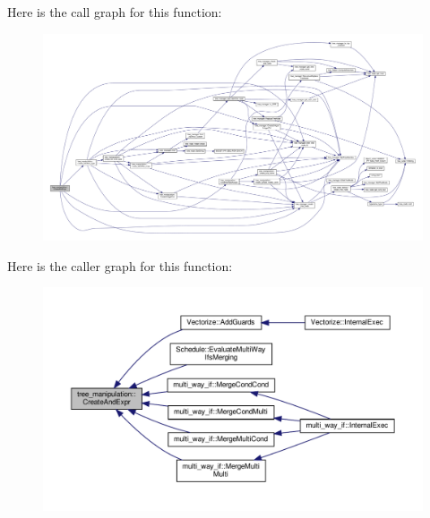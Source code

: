 Here is the call graph for this function\+:
\nopagebreak
\begin{figure}[H]
\begin{center}
\leavevmode
\includegraphics[width=350pt]{d0/d99/classtree__manipulation_a42828d578db679bde71a5bbaed66ee15_cgraph}
\end{center}
\end{figure}
Here is the caller graph for this function\+:
\nopagebreak
\begin{figure}[H]
\begin{center}
\leavevmode
\includegraphics[width=350pt]{d0/d99/classtree__manipulation_a42828d578db679bde71a5bbaed66ee15_icgraph}
\end{center}
\end{figure}
\mbox{\label{classtree__manipulation_aeb47755c334dbaf56f014949d98bcfda}} 
